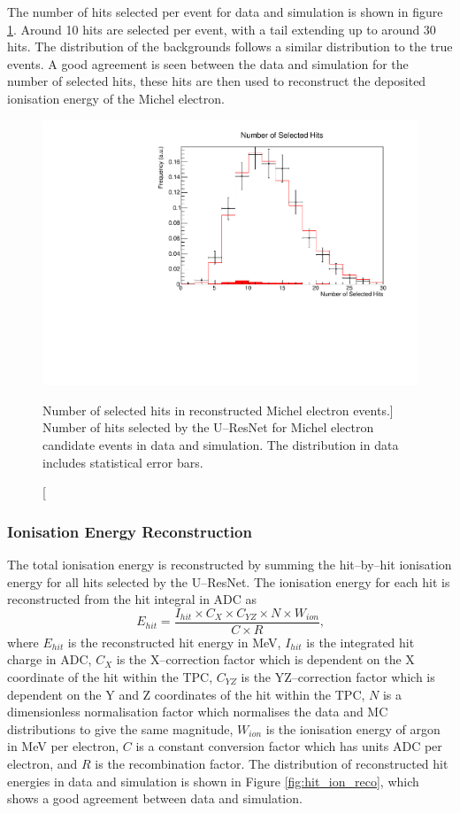 The number of hits selected per event for data and simulation is shown in 
figure \ref{fig:mich_n_hits}. Around 10 hits are selected per event, with a 
tail extending up to around 30 hits. The distribution of the backgrounds 
follows a similar distribution to the true events. A good agreement is seen 
between the data and simulation for the number of selected hits, these hits 
are then used to reconstruct the deposited ionisation energy of the Michel
electron.
\begin{figure}
	\centering
	\includegraphics[width=\textwidth]{figures/mich_n_hits.pdf}
	\caption
	[Number of selected hits in reconstructed Michel electron events.]
	{Number of hits selected by the U--ResNet for Michel electron candidate 
	events in data and simulation. The distribution in data includes statistical
	error bars.}
	\label{fig:mich_n_hits}
\end{figure}

\subsubsection{Ionisation Energy Reconstruction}

The total ionisation energy is reconstructed by summing the hit--by--hit
ionisation energy for all hits selected by the U--ResNet. The ionisation energy for
each hit is reconstructed from the hit integral in ADC as 
\begin{equation}
	E_{hit} = \frac{I_{hit} \times C_X \times C_{YZ} \times N \times W_{ion}}{C \times R}\mbox{,}
\end{equation}
where $E_{hit}$ is the reconstructed hit energy in MeV, $I_{hit}$ is the
integrated hit charge in ADC, $C_X$ is the X--correction factor which is
dependent on the X coordinate of the hit within the TPC, $C_{YZ}$ is the 
YZ--correction factor which is dependent on the Y and Z coordinates 
of the hit within the TPC, $N$ is a dimensionless normalisation factor which
normalises the data and MC distributions to give the same magnitude, $W_{ion}$
is the ionisation energy of argon in MeV per electron, $C$ is a constant
conversion factor which has units ADC per electron, and $R$ is the
recombination factor. The distribution of reconstructed hit energies in
\protodune{} data and simulation is shown in Figure \ref{fig:hit_ion_reco},
which shows a good agreement between data and simulation.

